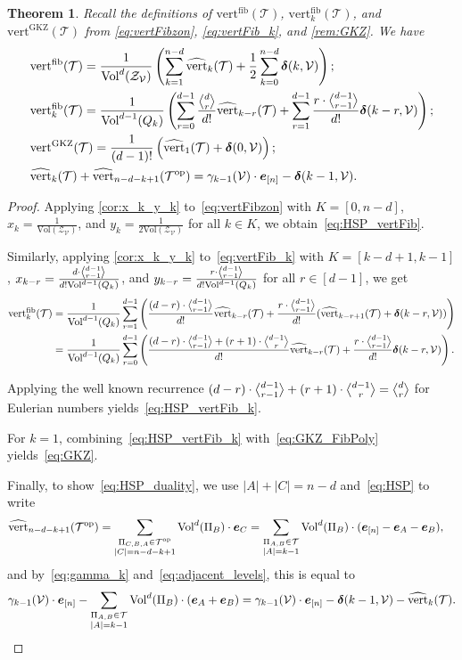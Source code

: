 \documentclass[11pt]{amsart}
\theoremstyle{plain}
\newtheorem{theorem}{Theorem}[section]
\theoremstyle{definition}
\def\V{\mathcal{V}}
\def\ddelta{\bm{\delta}}
\def\e{{\bm{e}}}
\def\Zon{\mathcal{Z}}
\def\ZV{\Zon_\V}
\def\Vol{\mathrm{Vol}}
\def\GKZ{{\operatorname{GKZ}}}
\newcommand\wh[1]{\hstretch{2}{\hat{\hstretch{0.5}{#1}}}}
\def\vert{\mathrm{vert}}
\def\vertHSP{\wh\vert}
\def\vertHSP{\widehat{\vert}}
\def\vertGKZ{\vert^\GKZ}
\def\vertFib{\vert^\fiber}
\def\fiber{{\operatorname{fib}}}
\def\VC{\V}
\def\Tcal{\mathcal{T}}
\def\Tiling{\Tcal}
\def\tile{\Pi}
\newcommand\summa[2]{\sum_{\substack{#1 \\ #2}}}
\def\sumlevel#1{\summa{\tile_{A,B}\in\Tiling}{|A|=#1}}
\def\Voldd{\Vol^{d-1}}
\def\Vold{\Vol^d}
\def\VolX(#1){\Vol^d(\tile_{#1})}
\def\VolB{\VolX(B)}
\newcommand{\Euli}{\genfrac{\langle}{\rangle}{0pt}{}}
\def\Eul(#1,#2){\Euli{#1}{#2}}
\begin{document}
\begin{theorem}\label{prop:HSP_vert}
Recall the definitions of 
  $\vertFib(\Tiling)$, 
	$\vertFib_k(\Tiling)$, and $\vertGKZ(\Tiling)$
from 	\eqref{eq:vertFibzon},
 \eqref{eq:vertFib_k}, and 
\cref{rem:GKZ}.
We have 	\begin{align}
\label{eq:HSP_vertFib}
  &\vertFib(\Tiling)=\frac1{\Vold(\ZV)} \left( \sum_{k=1}^{n-d} \vertHSP_k(\Tiling) +\frac12\sum_{k=0}^{n-d}\ddelta(k,\VC) \right);\\
\label{eq:HSP_vertFib_k}
  &\vertFib_k(\Tiling)=\frac1{\Voldd(Q_k)} \left( \sum_{r=0}^{d-1} \frac{\Eul(d,r)}{d!}\vertHSP_{k-r}(\Tiling) + \sum_{r=1}^{d-1}\frac{r\cdot \Eul(d-1,r-1)}{d!}\ddelta(k-r,\VC) \right);\\
		\label{eq:GKZ}	& \vertGKZ(\Tiling)=\frac1{(d-1)!} \left( \vertHSP_{1}(\Tiling) + \ddelta(0,\VC) \right); \\
\label{eq:HSP_duality}
  &\vertHSP_{k}(\Tiling)+\vertHSP_{n-d-k+1}(\TilingOP) =\gamma_{k-1}(\VC)\cdot \one_n-\ddelta(k-1,\VC).
\end{align}
\end{theorem}
\begin{proof}
Applying \cref{cor:x_k_y_k}  to~\eqref{eq:vertFibzon} 
	with $K=[0,n-d]$, $x_k=\frac1{\Vol(\ZV)}$, and $y_k=\frac1{2\Vol(\ZV)}$ for all $k\in K$, we obtain~\eqref{eq:HSP_vertFib}. 

	Similarly, applying \cref{cor:x_k_y_k}  to~\eqref{eq:vertFib_k} with $K=[k-d+1,k-1]$,  
	$x_{k-r}=\frac{d\cdot \Eul(d-1,r-1)}{d!\Voldd(Q_k)}$, and $y_{k-r}=\frac{r\cdot \Eul(d-1,r-1)}{d!\Voldd(Q_k)}$ for all $r\in [d-1]$, we get
\begin{align*}
  \vertFib_k(\Tiling)&=\frac1{\Voldd(Q_k)} \sum_{r=1}^{d-1}  \left( \frac{(d-r) \cdot \Eul(d-1,r-1)}{d!} \vertHSP_{k-r}(\Tiling)+\frac{r \cdot \Eul(d-1,r-1)}{d!} (\vertHSP_{k-r+1}(\Tiling)+\ddelta(k-r,\VC))\right)\\
   &=\frac1{\Voldd(Q_k)}\sum_{r=0}^{d-1}  \left(  \frac{(d-r)\cdot \Eul(d-1,r-1)+(r+1)\cdot \Eul(d-1,r)}{d!} \vertHSP_{k-r}(\Tiling)+\frac{r\cdot \Eul(d-1,r-1)}{d!}\ddelta(k-r,\VC)\right).
\end{align*}

\noindent Applying the well known recurrence $(d-r)\cdot \Eul(d-1,r-1)+(r+1)\cdot \Eul(d-1,r)=\Eul(d,r)$ for Eulerian numbers yields~\eqref{eq:HSP_vertFib_k}.

	For $k=1$,  combining~\eqref{eq:HSP_vertFib_k} with~\eqref{eq:GKZ_FibPoly} yields~\eqref{eq:GKZ}.

Finally, to show~\eqref{eq:HSP_duality}, we use $|A|+|C|=n-d$ and~\eqref{eq:HSP}
	to write
\begin{align*}
\vertHSP_{n-d-k+1}(\TilingOP)&=\summa{\tile_{C,B,A}\in\TilingOP}{|C|=n-d-k+1}\VolB\cdot \e_C=\sumlevel{k-1}\VolB\cdot (\e_{[n]}-\e_A-\e_B),
\end{align*}
and by~\eqref{eq:gamma_k} and~\eqref{eq:adjacent_levels}, this is equal to
\[
\gamma_{k-1}(\VC)\cdot \e_{[n]}-\sumlevel{k-1}\VolB\cdot (\e_A+\e_B)=\gamma_{k-1}(\VC)\cdot \e_{[n]}-\ddelta(k-1,\VC)-\vertHSP_{k}(\Tiling).\qedhere
\]
\end{proof}
\end{document}
